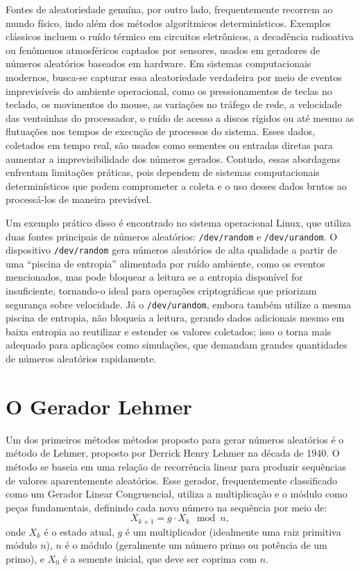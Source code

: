 Fontes de aleatoriedade genuína, por outro lado, frequentemente recorrem ao
mundo físico, indo além dos métodos algorítmicos determinísticos. Exemplos
clássicos incluem o ruído térmico em circuitos eletrônicos, a decadência
radioativa ou fenômenos atmosféricos captados por sensores, usados em geradores
de números aleatórios baseados em hardware. Em sistemas computacionais
modernos, busca-se capturar essa aleatoriedade verdadeira por meio de eventos
imprevisíveis do ambiente operacional, como os pressionamentos de teclas no
teclado, os movimentos do mouse, as variações no tráfego de rede, a velocidade
das ventoinhas do processador, o ruído de acesso a discos rígidos ou até mesmo
as flutuações nos tempos de execução de processos do sistema. Esses dados,
coletados em tempo real, são usados como sementes ou entradas diretas para
aumentar a imprevisibilidade dos números gerados.
Contudo, essas abordagens enfrentam limitações práticas, pois dependem de
sistemas computacionais determinísticos que podem comprometer a coleta e o uso
desses dados brutos ao processá-los de maneira previsível.

Um exemplo prático disso é encontrado no sistema operacional Linux, que utiliza
duas fontes principais de números aleatórios: \texttt{/dev/random} e
\texttt{/dev/urandom}. O dispositivo \texttt{/dev/random} gera números
aleatórios de alta qualidade a partir de uma ``piscina de entropia'' alimentada
por ruído ambiente, como os eventos mencionados, mas pode bloquear a leitura se
a entropia disponível for insuficiente, tornando-o ideal para operações
criptográficas que priorizam segurança sobre velocidade. Já o
\texttt{/dev/urandom}, embora também utilize a mesma piscina de entropia, não
bloqueia a leitura, gerando dados adicionais mesmo em baixa entropia ao
reutilizar e estender os valores coletados; isso o torna mais adequado para
aplicações como simulações, que demandam grandes quantidades de números
aleatórios rapidamente.

\section{O Gerador Lehmer}

Um dos primeiros métodos métodos proposto para gerar números aleatórios é o método de Lehmer,
proposto por Derrick Henry Lehmer na década de 1940. O método se baseia em uma
relação de recorrência linear para produzir sequências de valores aparentemente
aleatórios. Esse gerador, frequentemente classificado como um Gerador Linear
Congruencial, utiliza a multiplicação e o módulo como peças fundamentais, definindo
cada novo número na sequência por meio de:
\begin{equation}
  X_{k+1} = g \cdot X_k \mod n ,
\end{equation}
onde $X_k$ é o estado atual, $g$ é um multiplicador (idealmente uma raiz primitiva módulo $n$),
$n$ é o módulo (geralmente um número primo ou potência de um primo), e $X_0$ é a semente inicial,
que deve ser coprima com $n$. 

